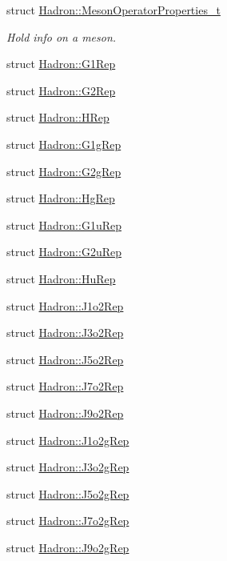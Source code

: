 \begin{DoxyCompactItemize}
struct \mbox{\hyperlink{structHadron_1_1MesonOperatorProperties__t}{Hadron\+::\+Meson\+Operator\+Properties\+\_\+t}}
\begin{DoxyCompactList}\small\item\em Hold info on a meson. \end{DoxyCompactList}\item 
struct \mbox{\hyperlink{structHadron_1_1G1Rep}{Hadron\+::\+G1\+Rep}}
\item 
struct \mbox{\hyperlink{structHadron_1_1G2Rep}{Hadron\+::\+G2\+Rep}}
\item 
struct \mbox{\hyperlink{structHadron_1_1HRep}{Hadron\+::\+H\+Rep}}
\item 
struct \mbox{\hyperlink{structHadron_1_1G1gRep}{Hadron\+::\+G1g\+Rep}}
\item 
struct \mbox{\hyperlink{structHadron_1_1G2gRep}{Hadron\+::\+G2g\+Rep}}
\item 
struct \mbox{\hyperlink{structHadron_1_1HgRep}{Hadron\+::\+Hg\+Rep}}
\item 
struct \mbox{\hyperlink{structHadron_1_1G1uRep}{Hadron\+::\+G1u\+Rep}}
\item 
struct \mbox{\hyperlink{structHadron_1_1G2uRep}{Hadron\+::\+G2u\+Rep}}
\item 
struct \mbox{\hyperlink{structHadron_1_1HuRep}{Hadron\+::\+Hu\+Rep}}
\item 
struct \mbox{\hyperlink{structHadron_1_1J1o2Rep}{Hadron\+::\+J1o2\+Rep}}
\item 
struct \mbox{\hyperlink{structHadron_1_1J3o2Rep}{Hadron\+::\+J3o2\+Rep}}
\item 
struct \mbox{\hyperlink{structHadron_1_1J5o2Rep}{Hadron\+::\+J5o2\+Rep}}
\item 
struct \mbox{\hyperlink{structHadron_1_1J7o2Rep}{Hadron\+::\+J7o2\+Rep}}
\item 
struct \mbox{\hyperlink{structHadron_1_1J9o2Rep}{Hadron\+::\+J9o2\+Rep}}
\item 
struct \mbox{\hyperlink{structHadron_1_1J1o2gRep}{Hadron\+::\+J1o2g\+Rep}}
\item 
struct \mbox{\hyperlink{structHadron_1_1J3o2gRep}{Hadron\+::\+J3o2g\+Rep}}
\item 
struct \mbox{\hyperlink{structHadron_1_1J5o2gRep}{Hadron\+::\+J5o2g\+Rep}}
\item 
struct \mbox{\hyperlink{structHadron_1_1J7o2gRep}{Hadron\+::\+J7o2g\+Rep}}
\item 
struct \mbox{\hyperlink{structHadron_1_1J9o2gRep}{Hadron\+::\+J9o2g\+Rep}}
\item 

\end{DoxyCompactItemize}
